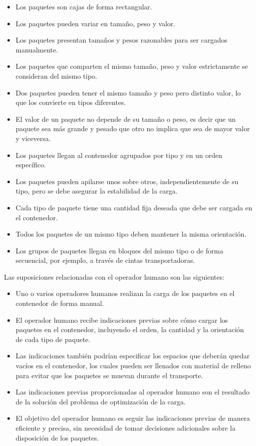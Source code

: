\begin{itemize}
    \item Los paquetes son cajas de forma rectangular.
    \item Los paquetes pueden variar en tamaño, peso y valor.
    \item Los paquetes presentan tamaños y pesos razonables para ser cargados manualmente.
    \item Los paquetes que comparten el mismo tamaño, peso y valor estrictamente se consideran del mismo tipo.
    \item Dos paquetes pueden tener el mismo tamaño y peso pero distinto valor, lo que los convierte en tipos diferentes.
    \item El valor de un paquete no depende de su tamaño o peso, es decir que un paquete sea más grande y pesado que otro no implica que sea de mayor valor y viceversa.
    \item Los paquetes llegan al contenedor agrupados por tipo y en un orden específico.
    \item Los paquetes pueden apilarse unos sobre otros, independientemente de su tipo, pero se debe asegurar la estabilidad de la carga.
    \item Cada tipo de paquete tiene una cantidad fija deseada que debe ser cargada en el contenedor.
    \item Todos los paquetes de un mismo tipo deben mantener la misma orientación.
    \item Los grupos de paquetes llegan en bloques del mismo tipo o de forma secuencial, por ejemplo, a través de cintas transportadoras.
\end{itemize}

Las suposiciones relacionadas con el operador humano son las siguientes:

\begin{itemize}
    \item Uno o varios operadores humanos realizan la carga de los paquetes en el contenedor de forma manual.
    \item El operador humano recibe indicaciones previas sobre cómo cargar los paquetes en el contenedor, incluyendo el orden, la cantidad y la orientación de cada tipo de paquete.
    \item Las indicaciones también podrían especificar los espacios que deberán quedar vacíos en el contenedor, los cuales pueden ser llenados con material de relleno para evitar que los paquetes se muevan durante el transporte.
    \item Las indicaciones previas proporcionadas al operador humano son el resultado de la solución del problema de optimización de la carga.
    \item El objetivo del operador humano es seguir las indicaciones previas de manera eficiente y precisa, sin necesidad de tomar decisiones adicionales sobre la disposición de los paquetes.
\end{itemize}

